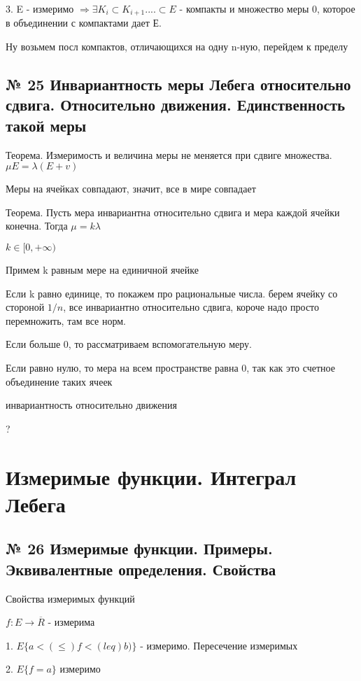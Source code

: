 \documentclass{article}
\begin{document}
3. E - измеримо $\Rightarrow \exists K_i \subset K_{i + 1} .... \subset E$ - компакты и множество меры 0, которое в объединении с компактами дает Е.

Ну возьмем посл компактов, отличающихся на одну n-ную, перейдем к пределу

\subsection{ \footnotesize № 25 Инвариантность меры Лебега относительно сдвига. Относительно движения. Единственность такой меры}

Теорема. Измеримость и величина меры не меняется при сдвиге множества. $\mu E = \lambda (E + v)$

Меры на ячейках совпадают, значит, все в мире совпадает

Теорема. Пусть мера инвариантна относительно сдвига и мера каждой ячейки конечна. Тогда $\mu = k\lambda$

$k \in [0, +\infty)$

Примем k равным мере на единичной ячейке

Если k равно единице, то покажем про рациональные числа. берем ячейку со стороной $1/n$, все инвариантно относительно сдвига, короче надо просто перемножить, там все норм.

Если больше 0, то рассматриваем вспомогательную меру.

Если равно нулю, то мера на всем пространстве равна 0, так как это счетное объединение таких ячеек

инвариантность относительно движения

?

\section{Измеримые функции. Интеграл Лебега}

\subsection{ \footnotesize № 26 Измеримые функции. Примеры. Эквивалентные определения. Свойства}

Свойства измеримых функций

$f : E \rightarrow \overline{R}$ - измерима

1. $E\{a <(\leq) f <(leq) b)\}$ - измеримо. Пересечение измеримых

2. $E\{f = a\}$ измеримо
\end{document}
